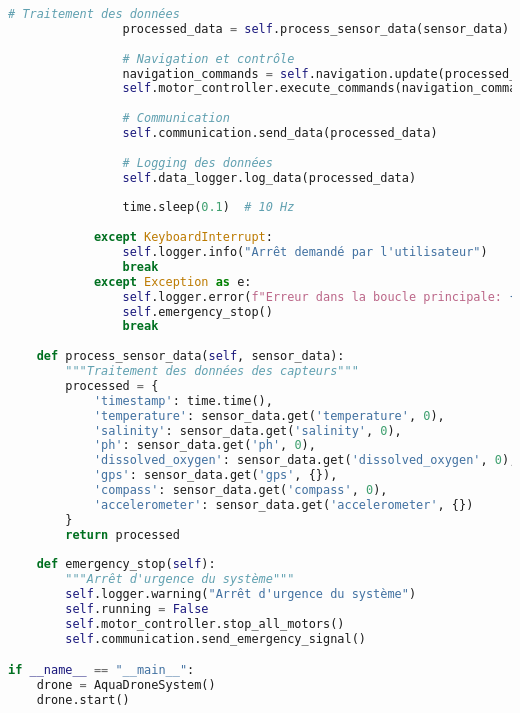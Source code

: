 \begin{lstlisting}[language=Python, caption=Programme principal du système, label=lst:main-program]
                # Traitement des données
                processed_data = self.process_sensor_data(sensor_data)
                
                # Navigation et contrôle
                navigation_commands = self.navigation.update(processed_data)
                self.motor_controller.execute_commands(navigation_commands)
                
                # Communication
                self.communication.send_data(processed_data)
                
                # Logging des données
                self.data_logger.log_data(processed_data)
                
                time.sleep(0.1)  # 10 Hz
                
            except KeyboardInterrupt:
                self.logger.info("Arrêt demandé par l'utilisateur")
                break
            except Exception as e:
                self.logger.error(f"Erreur dans la boucle principale: {e}")
                self.emergency_stop()
                break
    
    def process_sensor_data(self, sensor_data):
        """Traitement des données des capteurs"""
        processed = {
            'timestamp': time.time(),
            'temperature': sensor_data.get('temperature', 0),
            'salinity': sensor_data.get('salinity', 0),
            'ph': sensor_data.get('ph', 0),
            'dissolved_oxygen': sensor_data.get('dissolved_oxygen', 0),
            'gps': sensor_data.get('gps', {}),
            'compass': sensor_data.get('compass', 0),
            'accelerometer': sensor_data.get('accelerometer', {})
        }
        return processed
    
    def emergency_stop(self):
        """Arrêt d'urgence du système"""
        self.logger.warning("Arrêt d'urgence du système")
        self.running = False
        self.motor_controller.stop_all_motors()
        self.communication.send_emergency_signal()

if __name__ == "__main__":
    drone = AquaDroneSystem()
    drone.start()
\end{lstlisting}

